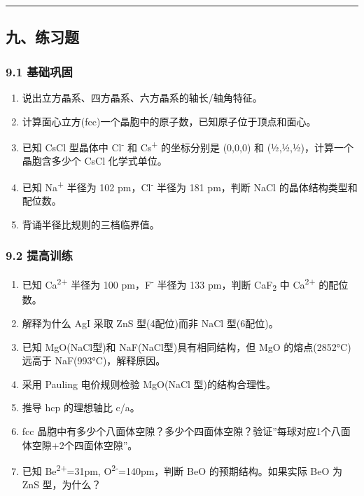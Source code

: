 \begin{center}\rule{0.5\linewidth}{0.5pt}\end{center}

\subsection{九、练习题}\label{ux4e5dux7ec3ux4e60ux9898}

\subsubsection{9.1 基础巩固}\label{ux57faux7840ux5de9ux56fa}

\begin{enumerate}
\def\labelenumi{\arabic{enumi}.}
\tightlist
\item
  说出立方晶系、四方晶系、六方晶系的轴长/轴角特征。
\item
  计算面心立方(fcc)一个晶胞中的原子数，已知原子位于顶点和面心。
\item
  已知 CsCl 型晶体中 Cl\textsuperscript{-} 和 Cs\textsuperscript{+} 的坐标分别是 (0,0,0) 和 (½,½,½)，计算一个晶胞含多少个 CsCl 化学式单位。
\item
  已知 Na\textsuperscript{+} 半径为 102 pm，Cl\textsuperscript{-} 半径为 181 pm，判断 NaCl 的晶体结构类型和配位数。
\item
  背诵半径比规则的三档临界值。
\end{enumerate}

\subsubsection{9.2 提高训练}\label{ux63d0ux9ad8ux8badux7ec3}

\begin{enumerate}
\def\labelenumi{\arabic{enumi}.}
\setcounter{enumi}{5}
\tightlist
\item
  已知 Ca\textsuperscript{2+} 半径为 100 pm，F\textsuperscript{-} 半径为 133 pm，判断 CaF\textsubscript{2} 中 Ca\textsuperscript{2+} 的配位数。
\item
  解释为什么 AgI 采取 ZnS 型(4配位)而非 NaCl 型(6配位)。
\item
  已知 MgO(NaCl型)和 NaF(NaCl型)具有相同结构，但 MgO 的熔点(2852°C)远高于 NaF(993°C)，解释原因。
\item
  采用 Pauling 电价规则检验 MgO(NaCl 型)的结构合理性。
\item
  推导 hcp 的理想轴比 c/a。
\item
  fcc 晶胞中有多少个八面体空隙？多少个四面体空隙？验证''每球对应1个八面体空隙+2个四面体空隙''。
\item
  已知 Be\textsuperscript{2+}=31pm, O\textsuperscript{2-}=140pm，判断 BeO 的预期结构。如果实际 BeO 为 ZnS 型，为什么？
\end{enumerate}


